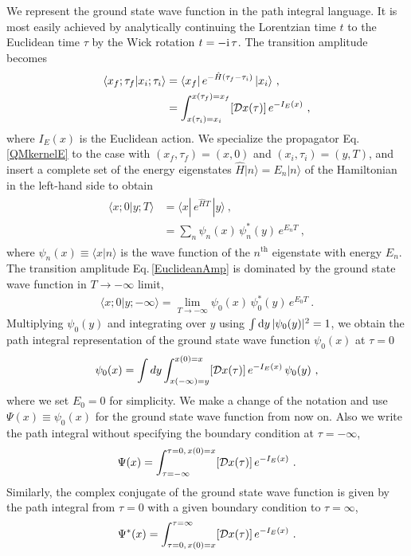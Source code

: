 We represent the ground state wave function in the path integral language.
It is most easily achieved by analytically continuing the Lorentzian time $t$ to the Euclidean time $\tau$ by the Wick rotation $t = - \mathrm{i}\,\tau$.
The transition amplitude becomes
\begin{align}\label{QMkernelE}
\begin{aligned}
	\langle x_f; \tau_f |x_i; \tau_i\rangle &= \langle x_f | \,e^{-\hat H(\tau_f - \tau_i)}\,|x_i\rangle \ ,\\
		&= \int_{x(\tau_i) = x_i}^{x(\tau_f) = x_f} [{\cal D} x(\tau)]\, e^{- I_E(x)} \ ,
\end{aligned}
\end{align}
where $I_E(x)$ is the Euclidean action.
We specialize the propagator Eq.\,\eqref{QMkernelE} to the case with $(x_f, \tau_f) = (x,0)$ and $(x_i, \tau_i) = (y,T)$, and insert a complete set of the energy eigenstates $\hat H |n\rangle = E_n |n\rangle$ of the Hamiltonian in the left-hand side to obtain
\begin{align}\label{EuclideanAmp}
\begin{aligned}
	\langle x; 0 | y; T\rangle &= \langle x | \,e^{\hat H T}\,|y\rangle \ , \\
			&= \sum_{n} \psi_n (x) \,\psi_n^\ast (y)\, e^{E_n T} \ ,
\end{aligned}
\end{align}
where $\psi_n(x) \equiv \langle x | n\rangle$ is the wave function of the $n^\text{th}$ eigenstate with energy $E_n$.
The transition amplitude Eq.\,\eqref{EuclideanAmp} is dominated by the ground state wave function in $T \to -\infty$ limit,
\begin{align}
	\langle x; 0 | y; -\infty \rangle = \lim_{T\to -\infty} \psi_0(x)\, \psi_0^\ast (y)\, e^{E_0 T} \ .
\end{align}
Multiplying $\psi_0(y)$ and integrating over $y$ using $\int \mathrm{d} y\, |\psi_0(y)|^2 = 1$, 
we obtain the path integral representation of the ground state wave function $\psi_0 (x)$ at $\tau =0$
\begin{align}
	\psi_0 (x) =  \int dy \int_{x(-\infty) = y}^{x(0) = x} [{\cal D} x(\tau)]\, e^{- I_E(x)}\,\psi_0(y) \ , 
\end{align}
where we set $E_0 = 0$ for simplicity.
We make a change of the notation and use $\Psi(x) \equiv \psi_0(x)$ for the ground state wave function from now on.
Also we write the path integral without specifying the boundary condition at $\tau = -\infty$,
\begin{align}\label{GSWFQM}
	\Psi (x) = \int_{\tau=-\infty}^{\tau = 0,\, x(0) = x} [{\cal D} x(\tau)]\, e^{- I_E(x)} \ .
\end{align}
Similarly, the complex conjugate of the ground state wave function is given by the path integral from $\tau = 0$ with a given boundary condition to $\tau = \infty$,
\begin{align}\label{GSWFQMC}
	\Psi^\ast (x) = \int^{\tau=\infty}_{\tau = 0,\, x(0) = x} [{\cal D} x(\tau)]\, e^{- I_E(x)} \ .
\end{align}

